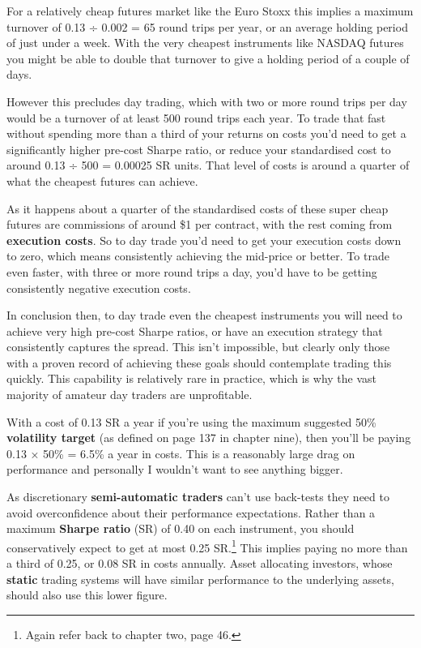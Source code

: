 For a relatively cheap futures market like the Euro Stoxx this implies a maximum turnover of 0.13 ÷ 0.002 = 65 round trips per year, or an average holding period of just under a week. With the very cheapest instruments like NASDAQ futures you might be able to double that turnover to give a holding period of a couple of days.

However this precludes day trading, which with two or more round trips per day would be a turnover of at least 500 round trips each year. To trade that fast without spending more than a third of your returns on costs you'd need to get a significantly higher pre-cost Sharpe ratio, or reduce your standardised cost to around 0.13 ÷ 500 = 0.00025 SR units. That level of costs is around a quarter of what the cheapest futures can achieve.

As it happens about a quarter of the standardised costs of these super cheap futures are commissions of around \$1 per contract, with the rest coming from \textbf{execution costs}. So to day trade you'd need to get your execution costs down to zero, which means consistently achieving the mid-price or better. To trade even faster, with three or more round trips a day, you'd have to be getting consistently negative execution costs.

In conclusion then, to day trade even the cheapest instruments you will need to achieve very high pre-cost Sharpe ratios, or have an execution strategy that consistently captures the spread. This isn't impossible, but clearly only those with a proven record of achieving these goals should contemplate trading this quickly. This capability is relatively rare in practice, which is why the vast majority of amateur day traders are unprofitable.

With a cost of 0.13 SR a year if you're using the maximum suggested 50\% \textbf{volatility target} (as defined on page 137 in chapter nine), then you'll be paying 0.13 × 50\% = 6.5\% a year in costs. This is a reasonably large drag on performance and personally I wouldn't want to see anything bigger.

As discretionary \textbf{semi-automatic traders} can't use back-tests they need to avoid overconfidence about their performance expectations. Rather than a maximum \textbf{Sharpe ratio} (SR) of 0.40 on each instrument, you should conservatively expect to get at most 0.25 SR.\footnote{Again refer back to chapter two, page 46.} This implies paying no more than a third of 0.25, or 0.08 SR in costs annually. Asset allocating investors, whose \textbf{static} trading systems will have similar performance to the underlying assets, should also use this lower figure.


